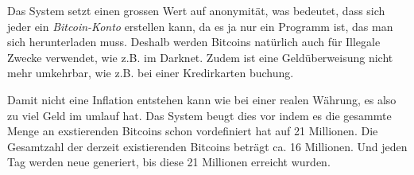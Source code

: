 \noindent
Das System setzt einen grossen Wert auf anonymität, was bedeutet, dass sich jeder ein \emph{\dq Bitcoin-Konto \dq} erstellen kann, da es ja nur ein
Programm ist, das man sich herunterladen muss. Deshalb werden Bitcoins natürlich auch für Illegale Zwecke verwendet, wie z.B. im Darknet. Zudem ist eine
Geldüberweisung nicht mehr umkehrbar, wie z.B. bei einer Kredirkarten buchung.

\noindent
Damit nicht eine Inflation entstehen kann wie bei einer realen Währung, es also zu viel Geld im umlauf hat. Das System beugt dies vor indem es die gesammte Menge
an exstierenden Bitcoins schon vordefiniert hat auf 21 Millionen. Die Gesamtzahl der derzeit existierenden Bitcoins beträgt ca. 16 Millionen. Und jeden Tag werden
neue generiert, bis diese 21 Millionen erreicht wurden.

\newpage
